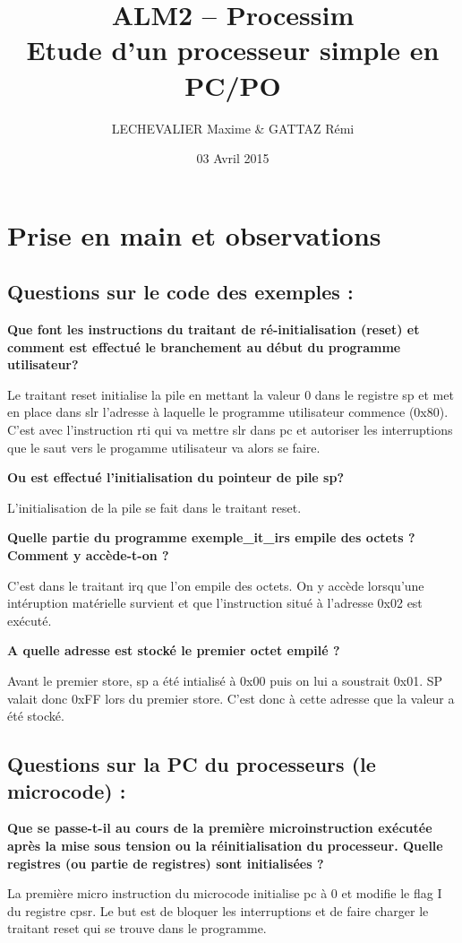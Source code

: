 \documentclass{myArticle}
\title{ALM2 – Processim\\Etude d'un processeur simple en PC/PO}
\author{LECHEVALIER Maxime \& GATTAZ Rémi}
\date{03 Avril 2015}
\begin{document}
\maketitle
\tableofcontents

\newpage
\section{Prise en main et observations}
\subsection{Questions sur le code des exemples :}
\textbf{Que font les instructions du traitant de ré-initialisation (reset) et comment est effectué
le branchement au début du programme utilisateur?}

Le traitant reset initialise la pile en mettant la valeur 0 dans le registre sp et met en place
dans slr l'adresse à laquelle le programme utilisateur commence (0x80). C'est avec l'instruction rti
qui va mettre slr dans pc et autoriser les interruptions que le saut vers le progamme utilisateur va
alors se faire.

\textbf{Ou est effectué l'initialisation du pointeur de pile sp?}

L'initialisation de la pile se fait dans le traitant reset.

\textbf{Quelle partie du programme exemple\_it\_irs empile des octets ? Comment y accède-t-on ?}

C'est dans le traitant irq que l'on empile des octets. On y accède lorsqu'une intéruption matérielle
survient et que l'instruction situé à l'adresse 0x02 est exécuté.

\textbf{A quelle adresse est stocké le premier octet empilé ?}

Avant le premier store, sp a été intialisé à 0x00 puis on lui a soustrait 0x01. SP valait donc 0xFF
lors du premier store. C'est donc à cette adresse que la valeur a été stocké.

\subsection{Questions sur la PC du processeurs (le microcode) :}
\textbf{Que se passe-t-il au cours de la première microinstruction exécutée après la mise sous tension
ou la réinitialisation du processeur. Quelle registres (ou partie de registres) sont initialisées ?}

La première micro instruction du microcode initialise pc à 0 et modifie le flag I du registre cpsr.
Le but est de bloquer les interruptions et de faire charger le traitant reset qui se trouve dans le
programme.
\end{document}
